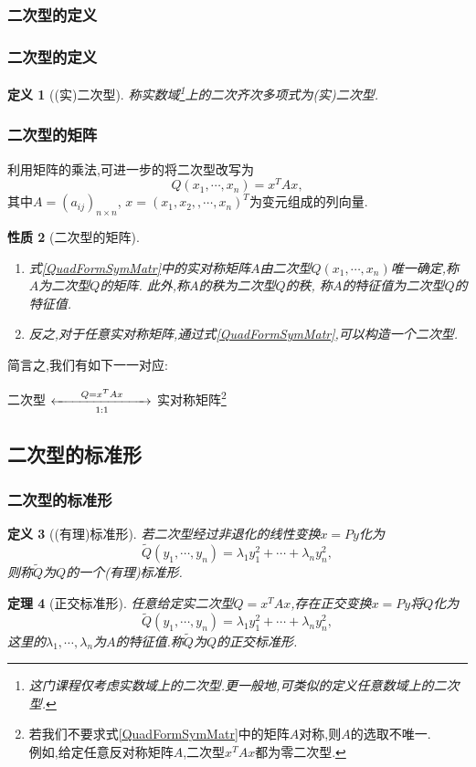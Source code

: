 \documentclass{article}
\newtheorem{theorem}{定理}  %
\newtheorem{proposition}[theorem]{性质}  %
\newtheorem{definition}[theorem]{定义}
\renewcommand{\blue }[1]{{\textcolor[rgb]{0,0,1}{#1}}}
\begin{document}
\subsubsection{二次型的定义}

\subsubsection{二次型的定义}
\begin{definition}[(实)二次型]
称实数域\footnote{这门课程仅考虑实数域上的二次型.更一般地,可类似的定义任意数域上的二次型.}上的二次齐次多项式为\blue{(实)二次型}.
\end{definition}

\subsubsection{二次型的矩阵}
利用矩阵的乘法,可进一步的将二次型改写为
\begin{equation} \label{QuadFormSymMatr}
Q(x_1,\cdots,x_n)=x^TAx,
\end{equation}
其中$A=(a_{ij})_{n\times n}$, $x=(x_1,x_2,,\cdots,x_n)^T$为变元组成的列向量.
\begin{proposition}[二次型的矩阵]
\begin{enumerate}
\item 式\eqref{QuadFormSymMatr}中的实对称矩阵$A$由二次型$Q(x_1,\cdots,x_n)$唯一确定,称$A$为\blue{二次型$Q$的矩阵}.
此外,称$A$的秩为\blue{二次型$Q$的秩},
称$A$的特征值为\blue{二次型$Q$的特征值}.
\item 反之,对于任意实对称矩阵,通过式\eqref{QuadFormSymMatr},可以构造一个二次型.
\end{enumerate}
\end{proposition}
简言之,我们有如下一一对应:
\begin{center}
\blue{二次型 $\xleftrightarrow[1:1]{\qquad Q=x^TAx\qquad}$ 实对称矩阵}\footnote{若我们不要求式\eqref{QuadFormSymMatr}中的矩阵$A$对称,则$A$的选取不唯一.\\例如,给定任意反对称矩阵$A$,二次型$x^TAx$都为零二次型.}
\end{center}


\subsection{二次型的标准形}


\subsubsection{二次型的标准形}
\begin{definition}[(有理)标准形]
若二次型经过非退化的线性变换$x=Py$化为
\[\widetilde{Q}(y_1,\cdots,y_n) = \lambda_1y_1^2+\cdots+\lambda_ny^2_n,\]
则称$\widetilde{Q}$为$Q$的一个\blue{(有理)标准形}.
\end{definition}
\begin{theorem}[正交标准形]
任意给定实二次型$Q=x^TAx$,存在正交变换$x=Py$将$Q$化为
\[\widetilde{Q}(y_1,\cdots,y_n) = \lambda_1y_1^2+\cdots+\lambda_ny_n^2,\]
这里的$\lambda_1,\cdots,\lambda_n$为$A$的特征值.称$\widetilde{Q}$为$Q$的\blue{正交标准形}.
\end{theorem}
\end{document}
